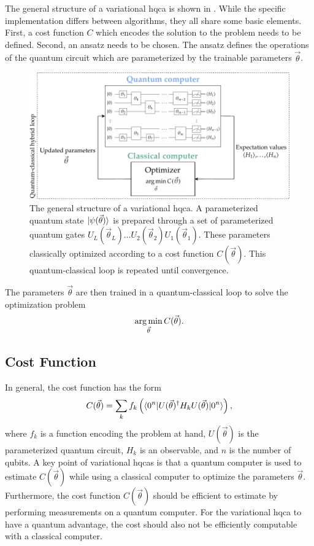 The general structure of a variational \gls{hqca} is shown in .
While the specific implementation differs between algorithms, they all share some basic elements.
First, a cost function $C$ which encodes the solution to the problem needs to be defined.
Second, an ansatz needs to be chosen.
The ansatz defines the operations of the quantum circuit which are parameterized by the trainable parameters $\vec{\theta}$.
\begin{figure}[ht]
    \centering
    \includegraphics[width=1\linewidth]{figures/vqa-general-structure.pdf}
    \caption[The general structure of a variational \acrshort{hqca}.]{The general structure of a variational \gls{hqca}. A parameterized quantum state $\vert{\psi(\vec{\theta})}\rangle$ is prepared through a set of parameterized quantum gates $U_L(\vec{\theta}_L) \ldots U_2(\vec{\theta}_2)U_1(\vec{\theta}_1)$. These parameters classically optimized according to a cost function $C(\vec{\theta})$. This quantum-classical loop is repeated until convergence.}
    \label{fig:vqa-general-structure}
\end{figure}
The parameters $\vec{\theta}$ are then trained in a quantum-classical loop to solve the optimization problem
\begin{equation}
\operatorname*{arg\,min}_{\vec{\theta}} C(\vec{\theta}).
\end{equation}

\subsection{Cost Function}
In general, the cost function has the form
\begin{equation}
C(\vec{\theta}) = \sum_k f_k\left(\langle{0^n}\vert U(\vec{\theta})^\dagger H_k U(\vec{\theta})\vert{0^n}\rangle\right),
\end{equation}
where $f_k$ is a function encoding the problem at hand, $U(\vec{\theta})$ is the parameterized quantum circuit, $H_k$ is an observable, and $n$ is the number of qubits.
A key point of variational \glspl{hqca} is that a quantum computer is used to estimate $C(\vec{\theta})$ while using a classical computer to optimize the parameters $\vec{\theta}$.
Furthermore, the cost function $C(\vec{\theta})$ should be efficient to estimate by performing measurements on a quantum computer.
For the variational \gls{hqca} to have a quantum advantage, the cost should also not be efficiently computable with a classical computer.

